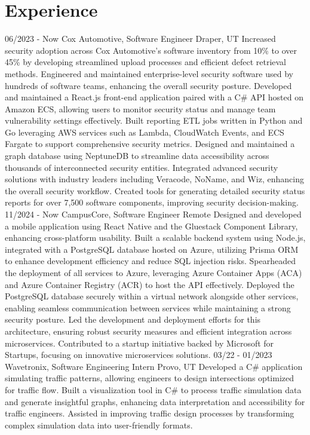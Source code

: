 \documentclass[]{friggeri-cv}
\begin{document}
\section{Experience}
\begin{entrylist}
	  \entry
	{06/2023 - Now}
	{Cox Automotive, Software Engineer}
	{Draper, UT}
	{ 
    Increased security adoption across Cox Automotive's software inventory from 10\% to over 45\% by developing streamlined upload processes and efficient defect retrieval methods.
    Engineered and maintained enterprise-level security software used by hundreds of software teams, enhancing the overall security posture.
    Developed and maintained a React.js front-end application paired with a C\# API hosted on Amazon ECS, allowing users to monitor security status and manage team vulnerability settings effectively.
    Built reporting ETL jobs written in Python and Go leveraging AWS services such as Lambda, CloudWatch Events, and ECS Fargate to support comprehensive security metrics.
    Designed and maintained a graph database using NeptuneDB to streamline data accessibility across thousands of interconnected security entities.
    Integrated advanced security solutions with industry leaders including Veracode, NoName, and Wiz, enhancing the overall security workflow.
    Created tools for generating detailed security status reports for over 7,500 software components, improving security decision-making.
  }
  \entry
    {11/2024 - Now}
    {CampusCore, Software Engineer}
    {Remote}
    {
    Designed and developed a mobile application using React Native and the Gluestack Component Library, enhancing cross-platform usability.
    Built a scalable backend system using Node.js, integrated with a PostgreSQL database hosted on Azure, utilizing Prisma ORM to enhance development efficiency and reduce SQL injection risks.
    Spearheaded the deployment of all services to Azure, leveraging Azure Container Apps (ACA) and Azure Container Registry (ACR) to host the API effectively.
    Deployed the PostgreSQL database securely within a virtual network alongside other services, enabling seamless communication between services while maintaining a strong security posture.
    Led the development and deployment efforts for this architecture, ensuring robust security measures and efficient integration across microservices.
    Contributed to a startup initiative backed by Microsoft for Startups, focusing on innovative microservices solutions.
    }
  \entry
    {03/22 - 01/2023}
    {Wavetronix, Software Engineering Intern}
    {Provo, UT}
    {Developed a C\# application simulating traffic patterns, allowing engineers to design intersections optimized for traffic flow.
    Built a visualization tool in C\# to process traffic simulation data and generate insightful graphs, enhancing data interpretation and accessibility for traffic engineers.
    Assisted in improving traffic design processes by transforming complex simulation data into user-friendly formats.
    }
\end{entrylist}
\end{document}
